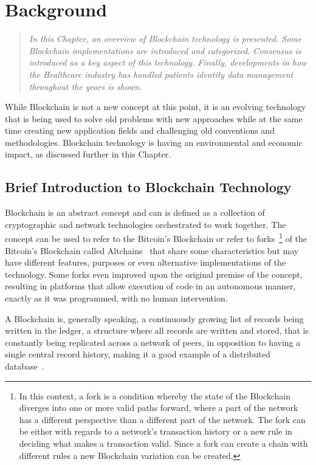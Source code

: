 \chapter{Background}\label{background}

\begin{quote} 
  \emph{In this Chapter, an overview of Blockchain technology is presented. Some Blockchain implementations are introduced and categorized. Consensus is introduced as a key aspect of this technology. Finally, developments in how the Healthcare industry has handled patients identity data management throughout the years is shown.}
\end{quote}


While Blockchain is not a new concept at this point, it is an evolving
technology that is being used to solve old problems with new approaches while
at the same time creating new application fields and challenging old
conventions and methodologies.  Blockchain technology is having an
environmental and economic impact, as discussed further in this
Chapter.

\section{Brief Introduction to Blockchain Technology}

Blockchain is an abstract concept and can is defined as a collection of
cryptographic and network technologies orchestrated to work together. The
concept can be used to refer to the Bitcoin's Blockchain or refer to
forks~\footnote{In this context, a fork is a condition whereby the state of the
Blockchain diverges into one or more valid paths forward, where a part of the
network has a different perspective than a different part of the network. The
fork can be either with regards to a network's transaction history or a new
rule in deciding what makes a transaction valid. Since a fork can create a
chain with different rules a new Blockchain variation can be created.} of the
Bitcoin's Blockchain called Altchains~\cite{Lewis2015} that share some
characteristics but may have different features, purposes or even alternative
implementations of the technology. Some forks even improved upon the original
premise of the concept, resulting in platforms that allow execution of code in
an autonomous manner, exactly as it was programmed, with no human intervention.

A Blockchain is, generally speaking, a continuously growing list of records
being written in the ledger, a structure where all records are written and
stored, that is constantly being replicated across a network of peers, in
opposition to having a single central record history, making it a good example
of a distributed database~\cite{Barclay2017}.

